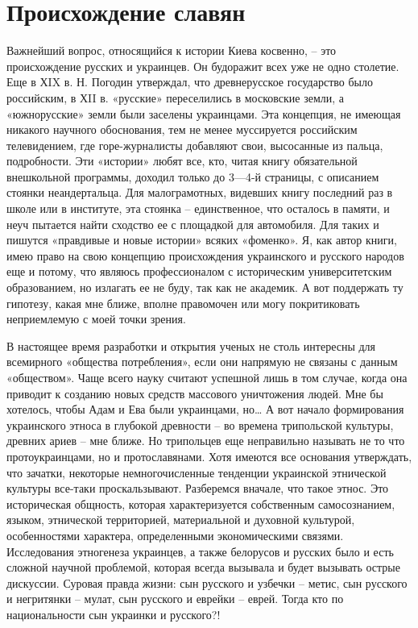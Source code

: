 \section{Происхождение славян}

Важнейший вопрос, относящийся к истории Киева косвенно, – это происхождение
русских и украинцев. Он будоражит всех уже не одно столетие. Еще в ХIX в. Н.
Погодин утверждал, что древнерусское государство было российским, в ХII в.
«русские» переселились в московские земли, а «южнорусские» земли были заселены
украинцами. Эта концепция, не имеющая никакого научного обоснования, тем не
менее муссируется российским телевидением, где горе-журналисты добавляют свои,
высосанные из пальца, подробности. Эти «истории» любят все, кто, читая книгу
обязательной внешкольной программы, доходил только до 3—4-й страницы, с
описанием стоянки неандертальца. Для малограмотных, видевших книгу последний
раз в школе или в институте, эта стоянка – единственное, что осталось в памяти,
и неуч пытается найти сходство ее с площадкой для автомобиля. Для таких и
пишутся «правдивые и новые истории» всяких «фоменко». Я, как автор книги, имею
право на свою концепцию происхождения украинского и русского народов еще и
потому, что являюсь профессионалом с историческим университетским образованием,
но излагать ее не буду, так как не академик. А вот поддержать ту гипотезу,
какая мне ближе, вполне правомочен или могу покритиковать неприемлемую с моей
точки зрения.

В настоящее время разработки и открытия ученых не столь интересны для
всемирного «общества потребления», если они напрямую не связаны с данным
«обществом». Чаще всего науку считают успешной лишь в том случае, когда она
приводит к созданию новых средств массового уничтожения людей. Мне бы хотелось,
чтобы Адам и Ева были украинцами, но… А вот начало формирования украинского
этноса в глубокой древности – во времена трипольской культуры, древних ариев –
мне ближе. Но трипольцев еще неправильно называть не то что протоукраинцами, но
и протославянами. Хотя имеются все основания утверждать, что зачатки, некоторые
немногочисленные тенденции украинской этнической культуры все-таки
проскальзывают. Разберемся вначале, что такое этнос. Это историческая общность,
которая характеризуется собственным самосознанием, языком, этнической
территорией, материальной и духовной культурой, особенностями характера,
определенными экономическими связями. Исследования этногенеза украинцев, а
также белорусов и русских было и есть сложной научной проблемой, которая всегда
вызывала и будет вызывать острые дискуссии. Суровая правда жизни: сын русского
и узбечки – метис, сын русского и негритянки – мулат, сын русского и еврейки –
еврей. Тогда кто по национальности сын украинки и русского?!

